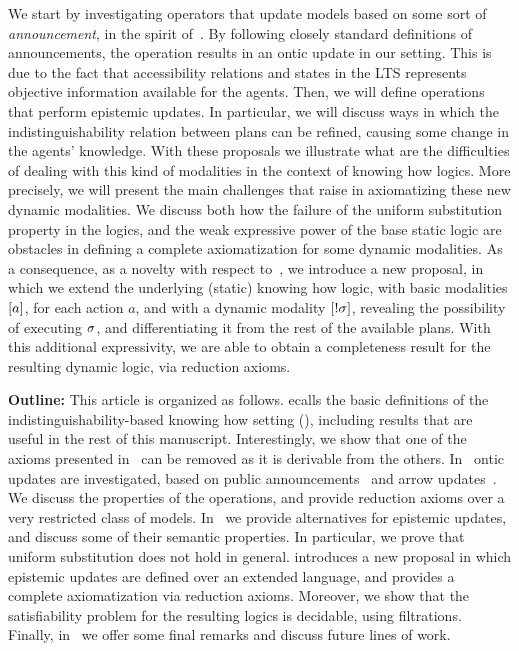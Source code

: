 We start by investigating operators that update models based on some sort of \emph{announcement}, in the spirit of~\cite{Plaza89:lopc}. By following closely standard definitions of announcements, the operation results in an ontic update in our setting. This is due to the fact that accessibility relations and states in the LTS represents objective information available for the agents. Then, we will define operations that perform epistemic updates. In particular, we will discuss ways in which the indistinguishability relation between plans can be refined, causing some change in the agents' knowledge. With these proposals we illustrate what are the difficulties of dealing with this kind of modalities in the context of knowing how logics. More precisely, we will present the main challenges that raise in axiomatizing these new dynamic modalities. We discuss both how the failure of the uniform substitution property in the logics, and the weak expressive power of the base static logic are obstacles in defining a complete axiomatization for some dynamic modalities. As a consequence, as a novelty with respect to~\cite{AFSV22}, we introduce a new proposal, in which we extend the underlying (static) knowing how logic, with basic modalities $[a]$, for each action $a$, and with a dynamic modality $[!\sigma]$, revealing the possibility of executing $\sigma$, and differentiating it from the rest of the available plans. With this additional expressivity, we are able to obtain a completeness result for the resulting dynamic logic, via reduction axioms.
\medskip

\noindent
\textbf{Outline:} This article is organized as follows.  ecalls the basic definitions of the indistinguishability-based knowing how setting (\cite{AFSVQ21,AFSVQ23report}), including results that are useful in the rest of this manuscript.  Interestingly, we show that one of the axioms presented in~\cite{AFSVQ21,AFSVQ23report} can be removed as it is derivable from the others. In~ ontic updates are investigated, based on public announcements~\cite{Plaza89:lopc} and arrow updates~\cite{KooiR11}. We discuss the properties of the operations, and provide reduction axioms over a very restricted class of models. In~ we provide alternatives for epistemic updates, and discuss some of their semantic properties. In particular, we prove that uniform substitution does not hold in general.  introduces a new proposal in which epistemic updates are defined over an extended language, and provides a complete axiomatization via reduction axioms. Moreover, we show that the satisfiability problem for the resulting logics is decidable, using filtrations. Finally, in~ we offer some final remarks and discuss future lines of work.
